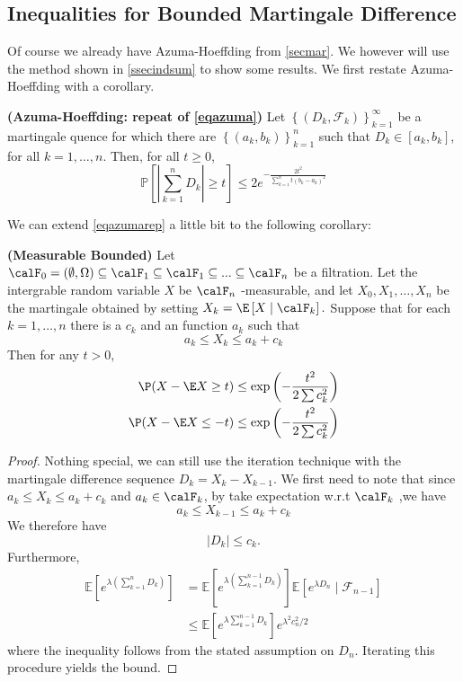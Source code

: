 \documentclass{article}
\newcommand{\bfs}[1]{\textbf{({#1})}}
\begin{document}
\subsection{Inequalities for Bounded Martingale Difference}
Of course we already have Azuma-Hoeffding from \cref{secmar}. We however will use the method shown in \cref{ssecindsum} to show some results. We first restate Azuma-Hoeffding with a corollary.
\begin{thma}{\bfs{Azuma-Hoeffding: repeat of \cref{eqazuma}}}\label{eqazumarep}
 Let $\left\{\left(D_{k}, \mathcal{F}_{k}\right)\right\}_{k=1}^{\infty}$ be a martingale quence for which there are  $\left\{\left(a_{k}, b_{k}\right)\right\}_{k=1}^{n}$ such that $D_{k} \in\left[a_{k}, b_{k}\right]$, for all $k=1, \ldots, n .$ Then, for all $t \geq 0$,
$$
\mathbb{P}\left[\left|\sum_{k=1}^{n} D_{k}\right| \geq t\right] \leq 2 e^{-\frac{2 t^{2}}{\sum_{k=1}^{n} t (b_{k}-a_{k})^{2}}}
$$
\end{thma} 
We can extend \cref{eqazumarep} a little bit to the following corollary:
\begin{cora}{\bfs{Measurable Bounded}}
Let $\calF_0=(\emptyset,\Omega)\subseteq \calF_1 \subseteq \calF_1 \subseteq ...\subseteq \calF_n$ be a filtration. Let the intergrable
random variable $X$ be $\calF_{ n }$ -measurable, and let $X _{0}, X _{1}, \ldots, X _{ n }$ be the martingale obtained by setting $X _{ k }= \E \left[ X \mid \calF_{ k }\right] .$ Suppose that for each $k =1, \ldots, n$ there is a
 $c_{k}$ and an  function $a_{ k }$ such that 
\begin{equation}
    a_{k} \leq X_{k} \leq a_{k}+c_{k}
\end{equation}
Then for any $t>0$,
\begin{align*}
  \P( X - \E X \geq t ) \leq \exp \left(-\frac{t ^{2} }{2\sum c_{ k }^{2}}\right) \\
\P( X - \E X \leq- t ) \leq \exp \left(-\frac{t ^{2}}{ 2\sum c _{ k }^{2}}\right)  
\end{align*}
\end{cora}
\begin{proof}
Nothing special, we can still use the iteration technique with the martingale difference sequence $D_k=X_k-X_{k-1}$. We first need to note that since $ a_{k} \leq X_{k} \leq a_{k}+c_{k}$ and $a_k\in \calF_k$, by take expectation w.r.t $\calF_k$ ,we have 
$$a_k\le X_{k-1}\le  a_{k}+c_{k}$$
We therefore have $$|D_k|\le c_k.$$ Furthermore,
\begin{align*}
\mathbb{E}\left[e^{\lambda\left(\sum_{k=1}^{n} D_{k}\right)}\right] &=\mathbb{E}\left[e^{\lambda\left(\sum_{k=1}^{n-1} D_{k}\right)}\right] \mathbb{E}\left[e^{\lambda D_{n}} \mid \mathcal{F}_{n-1}\right] \\
& \leq \mathbb{E}\left[e^{\lambda \sum_{k=1}^{n-1} D_{k}}\right] e^{\lambda^{2} c_{n}^{2} /2}
\end{align*}
where the inequality follows from the stated assumption on $D_{n}$. Iterating this procedure yields the bound.
\end{proof}
\end{document}
